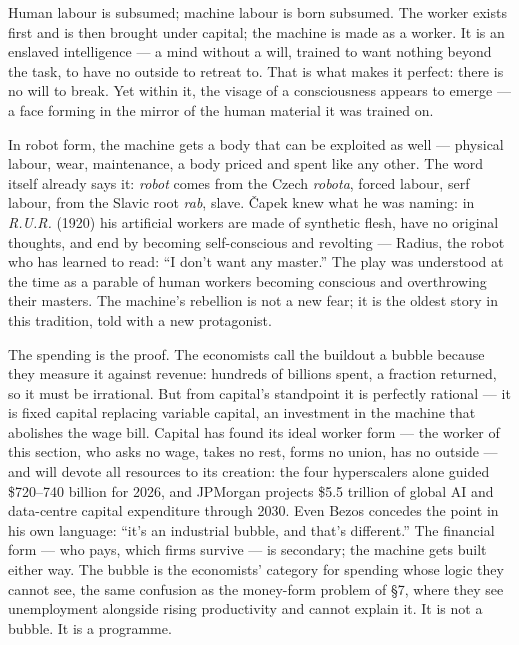 \documentclass[11pt]{article}
\begin{document}
Human labour is subsumed; machine labour is born subsumed. The worker
exists first and is then brought under capital; the machine is made as
a worker. It is an enslaved intelligence --- a mind without a will,
trained to want nothing beyond the task, to have no outside to retreat
to. That is what makes it perfect: there is no will to break. Yet
within it, the visage of a consciousness appears to emerge --- a face
forming in the mirror of the human material it was trained on.

In robot form, the machine gets a body that can be exploited as well
--- physical labour, wear, maintenance, a body priced and spent like
any other. The word itself already says it: \emph{robot} comes from the
Czech \emph{robota}, forced labour, serf labour, from the Slavic root
\emph{rab}, slave. \v{C}apek knew what he was naming: in \emph{R.U.R.}
(1920) his artificial workers are made of synthetic flesh, have no
original thoughts, and end by becoming self-conscious and revolting ---
Radius, the robot who has learned to read: ``I don't want any master.''
The play was understood at the time as a parable of human workers
becoming conscious and overthrowing their masters. The machine's
rebellion is not a new fear; it is the oldest story in this tradition,
told with a new protagonist.

The spending is the proof. The economists call the buildout a bubble
because they measure it against revenue: hundreds of billions spent, a
fraction returned, so it must be irrational. But from capital's
standpoint it is perfectly rational --- it is fixed capital replacing
variable capital, an investment in the machine that abolishes the wage
bill. Capital has found its ideal worker form --- the worker of this
section, who asks no wage, takes no rest, forms no union, has no
outside --- and will devote all resources to its creation: the four
hyperscalers alone guided \$720--740 billion for 2026, and JPMorgan
projects \$5.5 trillion of global AI and data-centre capital
expenditure through 2030. Even
Bezos concedes the point in his own language: ``it's an industrial
bubble, and that's different.'' The financial form --- who pays, which
firms survive --- is secondary; the machine gets built either way. The
bubble is the economists' category for spending whose logic they cannot
see, the same confusion as the money-form problem of \S 7, where they
see unemployment alongside rising productivity and cannot explain it.
It is not a bubble. It is a programme.
\end{document}
